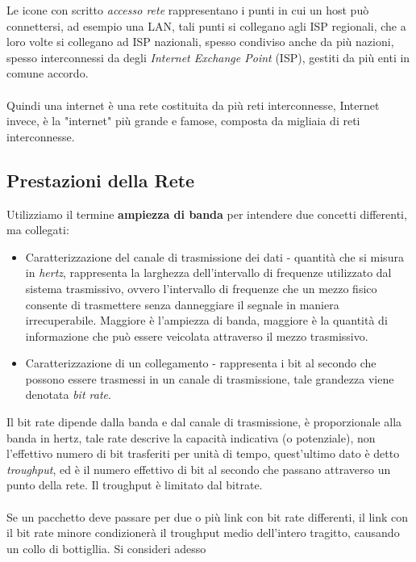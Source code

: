 \documentclass[12pt, letterpaper]{article}
\newcommand{\acc}{\\\hphantom{}\\}
\begin{document}
Le icone con scritto \textit{accesso rete} rappresentano i punti in cui un host può connettersi, ad esempio una LAN, tali punti si 
collegano agli ISP regionali, che a loro volte si collegano ad ISP nazionali, spesso condiviso anche da più nazioni, spesso 
interconnessi da degli \textit{Internet Exchange Point} (ISP), gestiti da più enti in comune accordo.\acc Quindi una 
internet è una rete costituita da più reti interconnesse, Internet invece, è la "internet" più grande e famose, composta da migliaia di reti 
interconnesse.
\subsection{Prestazioni della Rete}
Utilizziamo il termine \textbf{ampiezza di banda} per intendere due concetti differenti, ma collegati: \begin{itemize}
    \item Caratterizzazione del canale di trasmissione dei dati - quantità che si misura in \textit{hertz}, 
    rappresenta la larghezza dell'intervallo di frequenze utilizzato dal sistema trasmissivo,
    ovvero l'intervallo di frequenze che un mezzo fisico consente di trasmettere senza
    danneggiare il segnale in maniera irrecuperabile. Maggiore è l'ampiezza di banda,
    maggiore è la quantità di informazione che può essere veicolata attraverso il mezzo
    trasmissivo.
    \item Caratterizzazione di un collegamento - rappresenta i bit al secondo che possono essere trasmessi 
    in un canale di trasmissione, tale grandezza viene denotata \textit{bit rate}.
\end{itemize}
Il bit rate dipende dalla banda e dal canale di trasmissione, è proporzionale alla banda in hertz, tale rate descrive 
la capacità indicativa (o potenziale), non l'effettivo numero di bit trasferiti per unità di tempo, quest'ultimo 
dato è detto \textit{troughput}, ed è il numero effettivo di bit al secondo che passano attraverso un 
punto della rete. Il troughput è limitato dal bitrate.\acc 
Se un pacchetto deve passare per due o più link con bit rate differenti, il link con il bit rate minore 
condizionerà il troughput medio dell'intero tragitto, causando un collo di bottigllia. Si consideri adesso 
\end{document}
